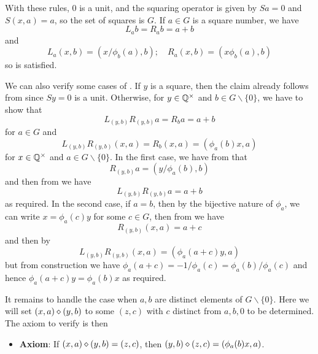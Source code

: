 With these rules, $0$ is a unit, and the squaring operator is given by $Sa = 0$ and $S(x,a) = a$, so the set of squares is $G$.  If $a \in G$ is a square number, we have
$$ L_a b = R_a b = a+b$$
and
$$ L_a (x,b) = (x/\phi_b(a), b); \quad R_a (x,b) = (x \phi_b(a), b)$$
so  is satisfied.

We can also verify some cases of .  If $y$ is a square, then the claim already follows from  since $Sy=0$ is a unit.  Otherwise, for $y \in \mathbb{Q}^\times$ and $b \in G \backslash \{0\}$, we have to show that
$$ L_{(y,b)} R_{(y,b)} a = R_b a = a+b$$
for $a \in G$ and
$$ L_{(y,b)} R_{(y,b)} (x,a) = R_b (x,a) = (\phi_a(b) x, a) $$
for $x \in \mathbb{Q}^\times$ and $a \in G \backslash \{0\}$.  In the first case, we have from  that
$$ R_{(y,b)} a = (y/\phi_a(b), b)$$
and then from  we have
$$L_{(y,b)} R_{(y,b)} a = a+b$$
as required.  In the second case, if $a=b$, then by the bijective nature of $\phi_a$, we can write $x = \phi_a(c) y$ for some $c \in G$, then from  we have
$$ R_{(y,b)} (x,a) = a+c$$
and then by 
$$ L_{(y,b)} R_{(y,b)} (x,a) = (\phi_a(a+c) y, a)$$
but from construction we have $\phi_a(a+c)=-1/\phi_a(c) = \phi_a(b)/\phi_a(c)$ and hence $\phi_a(a+c) y = \phi_a(b) x$ as required.

It remains to handle the case when $a,b$ are distinct elements of $G \backslash \{0\}$.  Here we will set $(x,a) \diamond (y,b)$ to some $(z,c)$ with $c$ distinct from $a,b,0$ to be determined.  The axiom to verify is then
\begin{itemize}
\item {\bf Axiom}: If $(x,a) \diamond (y,b) = (z,c)$, then $(y,b) \diamond (z,c) = (\phi_a(b) x,a)$.
\end{itemize}

